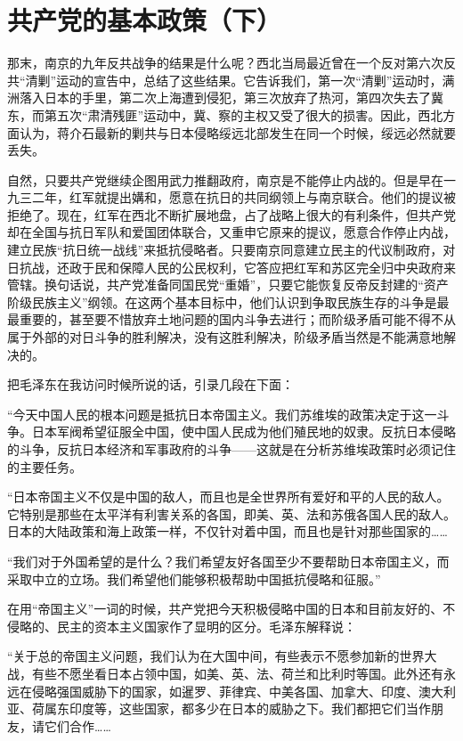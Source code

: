 \documentclass[10pt]{book}
\begin{document}
\section{共产党的基本政策（下）}

那末，南京的九年反共战争的结果是什么呢？西北当局最近曾在一个反对第六次反共“清剿”运动的宣告中，总结了这些结果。它告诉我们，第一次“清剿”运动时，满洲落入日本的手里，第二次上海遭到侵犯，第三次放弃了热河，第四次失去了冀东，而第五次“肃清残匪”运动中，冀、察的主权又受了很大的损害。因此，西北方面认为，蒋介石最新的剿共与日本侵略绥远北部发生在同一个时候，绥远必然就要丢失。

自然，只要共产党继续企图用武力推翻政府，南京是不能停止内战的。但是早在一九三二年，红军就提出媾和，愿意在抗日的共同纲领上与南京联合。他们的提议被拒绝了。现在，红军在西北不断扩展地盘，占了战略上很大的有利条件，但共产党却在全国与抗日军队和爱国团体联合，又重申它原来的提议，愿意合作停止内战，建立民族“抗日统一战线”来抵抗侵略者。只要南京同意建立民主的代议制政府，对日抗战，还政于民和保障人民的公民权利，它答应把红军和苏区完全归中央政府来管辖。换句话说，共产党准备同国民党“重婚”，只要它能恢复反帝反封建的“资产阶级民族主义”纲领。在这两个基本目标中，他们认识到争取民族生存的斗争是最最重要的，甚至要不惜放弃土地问题的国内斗争去进行；而阶级矛盾可能不得不从属于外部的对日斗争的胜利解决，没有这胜利解决，阶级矛盾当然是不能满意地解决的。

把毛泽东在我访问时候所说的话，引录几段在下面：

“今天中国人民的根本问题是抵抗日本帝国主义。我们苏维埃的政策决定于这一斗争。日本军阀希望征服全中国，使中国人民成为他们殖民地的奴隶。反抗日本侵略的斗争，反抗日本经济和军事政府的斗争——这就是在分析苏维埃政策时必须记住的主要任务。

“日本帝国主义不仅是中国的敌人，而且也是全世界所有爱好和平的人民的敌人。它特别是那些在太平洋有利害关系的各国，即美、英、法和苏俄各国人民的敌人。日本的大陆政策和海上政策一样，不仅针对着中国，而且也是针对那些国家的……

“我们对于外国希望的是什么？我们希望友好各国至少不要帮助日本帝国主义，而采取中立的立场。我们希望他们能够积极帮助中国抵抗侵略和征服。”

在用“帝国主义”一词的时候，共产党把今天积极侵略中国的日本和目前友好的、不侵略的、民主的资本主义国家作了显明的区分。毛泽东解释说：

“关于总的帝国主义问题，我们认为在大国中间，有些表示不愿参加新的世界大战，有些不愿坐看日本占领中国，如美、英、法、荷兰和比利时等国。此外还有永远在侵略强国威胁下的国家，如暹罗、菲律宾、中美各国、加拿大、印度、澳大利亚、荷属东印度等，这些国家，都多少在日本的威胁之下。我们都把它们当作朋友，请它们合作……
\end{document}
